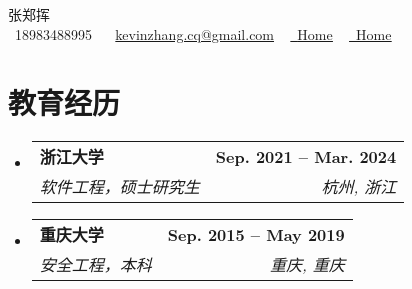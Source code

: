 \documentclass[letterpaper,11pt]{ctexart}
\makeatletter
\newcommand{\resumeSubheading}[4]{
  \vspace{-2pt}\item
    \begin{tabular*}{1.0\textwidth}[t]{l@{\extracolsep{\fill}}r}
      \textbf{#1} & \textbf{\small #2} \\
      \textit{\small#3} & \textit{\small #4} \\
    \end{tabular*}\vspace{-7pt}
}
\newcommand{\resumeSubHeadingListStart}{\begin{itemize}[leftmargin=0.0in, label={}]}
\newcommand{\resumeSubHeadingListEnd}{\end{itemize}}
\makeatother
\begin{document}

\begin{center}
    {\Huge \scshape 张郑挥} \\ \vspace{1pt}
    \vspace{1pt}
    \small \raisebox{-0.1\height}\faPhone\ 18983488995 ~ \raisebox{-0.2\height}\faEnvelope\  \underline{kevinzhang.cq@gmail.com} ~
    \href{https://linkedin.com/in/kevin-zhang-95245521b/}{\raisebox{-0.2\height}\faLinkedin\ \underline{Home}}  ~
    \href{https://github.com/kevin-zhangzh}{\raisebox{-0.2\height}\faGithub\ \underline{Home}}
    \vspace{-8pt}
\end{center}


\section{教育经历}
  \resumeSubHeadingListStart
    \resumeSubheading
      {浙江大学}{Sep. 2021 -- Mar. 2024}
      {软件工程，硕士研究生}{杭州, 浙江}
    \resumeSubheading
      {重庆大学}{Sep. 2015 -- May 2019}
      {安全工程，本科}{重庆, 重庆}
  \resumeSubHeadingListEnd

\end{document}
